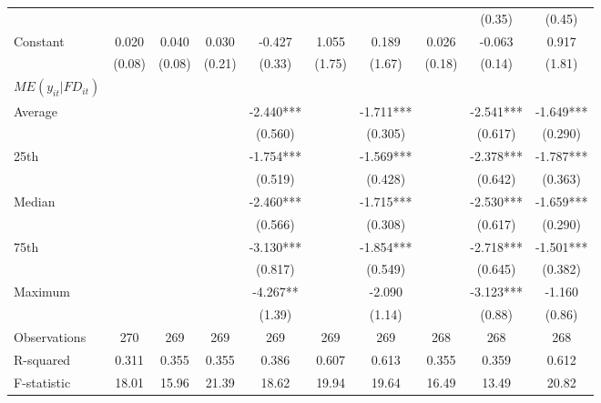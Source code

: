 \documentclass[12pt, a4paper]{article}
\begin{document}
\begin{table}[htbp]
\begin{threeparttable}
{\begin{tabular}{l*{9}{c}}
				&                     &                     &                     &                     &                     &                     &                     &      (0.35)         &      (0.45)         \\
				Constant            &       0.020         &       0.040         &       0.030         &      -0.427         &       1.055         &       0.189         &       0.026         &      -0.063         &       0.917         \\
				&      (0.08)         &      (0.08)         &      (0.21)         &      (0.33)         &      (1.75)         &      (1.67)         &      (0.18)         &      (0.14)         &      (1.81)         \\
				\hline
				$ME(y_{it}|FD_{it})$ \\
				Average & & & & -2.440*** & & -1.711***	& &	-2.541*** & -1.649***\\
				& & & &(0.560) & & (0.305) & & (0.617)  &	(0.290)   \\
				25th & & & & -1.754***	& &	-1.569*** & & -2.378***	&	-1.787***\\
				& & & & (0.519) & &	(0.428) & &	(0.642) & (0.363) \\  
				Median & & & & -2.460*** & & -1.715***	& &	-2.530*** & -1.659***\\
				& & & & (0.566) & & (0.308) & & (0.617) & (0.290) \\
				75th & & & & -3.130***	& &	-1.854*** & & -2.718*** & -1.501***\\
				& & & & (0.817) & & (0.549) & & (0.645) & (0.382)\\
				Maximum	& & & & -4.267** & & -2.090 & &	-3.123*** &	-1.160\\
				& & & & (1.39)  & & (1.14) & & (0.88)  &  (0.86)   \\
				\hline
				Observations        &         270         &         269         &         269         &         269         &         269         &         269         &         268         &         268         &         268         \\
				R-squared           &       0.311         &       0.355         &       0.355         &       0.386         &       0.607         &       0.613         &       0.355         &       0.359         &       0.612         \\
				F-statistic         &       18.01         &       15.96         &       21.39         &       18.62         &       19.94         &       19.64         &       16.49         &       13.49         &       20.82         \\

\end{tabular}}
\end{threeparttable}
\end{table}
\end{document}
